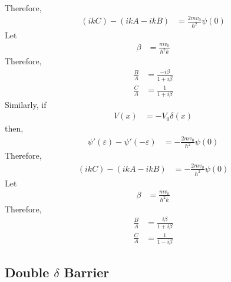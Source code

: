 \documentclass[titlepage, fleqn, a4paper, 12pt, twoside]{article}
\theoremstyle{definition}
\theoremstyle{theorem}
\begin{document}
Therefore,
\begin{align*}
	(i k C) - (i k A - i k B) &= \frac{2 m v_0}{\hbar^2} \psi(0)
\end{align*}
Let
\begin{align*}
	\beta &= \frac{m v_0}{\hbar^2 k}
\end{align*}
Therefore,
\begin{align*}
	\frac{B}{A} &= \frac{-i \beta}{1 + i \beta}\\
	\frac{C}{A} &= \frac{1}{1 + i \beta}
\end{align*}
Similarly, if
\begin{align*}
	V(x) &= -V_0 \delta(x)
\end{align*}
then,
\begin{align*}
	\psi'(\varepsilon) - \psi'(-\varepsilon) &= -\frac{2 m v_0}{\hbar^2} \psi(0)
\end{align*}
Therefore,
\begin{align*}
	(i k C) - (i k A - i k B) &= -\frac{2 m v_0}{\hbar^2} \psi(0)
\end{align*}
Let
\begin{align*}
	\beta &= \frac{m v_0}{\hbar^2 k}
\end{align*}
Therefore,
\begin{align*}
	\frac{B}{A} &= \frac{i \beta}{1 + i \beta}\\
	\frac{C}{A} &= \frac{1}{1 - i \beta}
\end{align*}

\subsection{Double $\delta$ Barrier}
\end{document}
